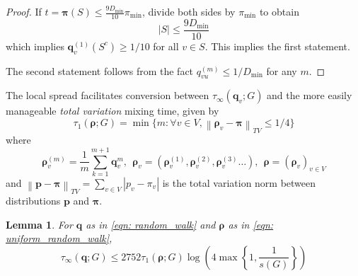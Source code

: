 \documentclass{article}
\newcommand{\abs}[1]{\left \lvert #1 \right \rvert}
\newcommand{\norm}[1]{\left\lVert#1\right\rVert}
\newcommand{\1}{\mathbf{1}}
\newcommand{\pbf}{\mathbf{p}}
\newcommand{\qbf}{\mathbf{q}}
\newcommand{\pibf}{\bm{\pi}}
\newcommand{\rhobf}{\bm{\rho}}
\theoremstyle{aldenthm}
\newtheorem{lemma}{Lemma}
\begin{document}
\begin{proof}
	If $t = \pibf(S) \leq \frac{9 D_{\min}}{10} \pi_{\min}$, divide both sides by $\pi_{\min}$ to obtain
	\begin{equation*}
	\abs{S} \leq \frac{9 D_{\min}}{10}
	\end{equation*}
	which implies $\qbf_{v}^{(1)}(S^c) \geq 1/10$ for all $v \in S$. This implies the first statement.
	
	The second statement follows from the fact $q_{vu}^{(m)} \leq 1/D_{\min}$ for any $m$.
\end{proof}

The local spread facilitates conversion between $\tau_{\infty}(\qbf_v; G)$ and the more easily manageable \emph{total variation} mixing time, given by
\begin{equation*}
\tau_1(\rhobf; G) = \min\biggl\{m: \forall v \in V, \norm{\rhobf_v - \pibf}_{TV} \leq 1/4 \biggr\}
\end{equation*}
where 
\begin{equation}
\label{eqn: uniform_random_walk}
\rhobf_{v}^{(m)} = \frac{1}{m}\sum_{k = 1}^{m+1} \qbf_{v}^{m}, ~~ \rhobf_v = \left( \rhobf_{v}^{(1)}, \rhobf_{v}^{(2)}, \rhobf_{v}^{(3)} \ldots \right), ~~ \rhobf = \left( \rhobf_v \right)_{v \in V}
\end{equation}
and $\norm{\pbf - \pibf}_{TV} = \sum_{v \in V}\abs{p_v - \pi_v}$ is the total variation norm between distributions $\pbf$ and $\pibf$. 
\begin{lemma}
	\label{lem: tv_mixing_to_pointwise_mixing1}
	For $\qbf$ as in \eqref{eqn: random_walk} and $\rhobf$ as in \eqref{eqn: uniform_random_walk},
	\begin{equation*}
	\tau_{\infty}(\qbf; G) \leq 2752 \tau_1(\rhobf; G) \log \left(4 \max\left\{1, \frac{1}{s(G)}\right\}\right)
	\end{equation*}
\end{lemma}
\end{document}
